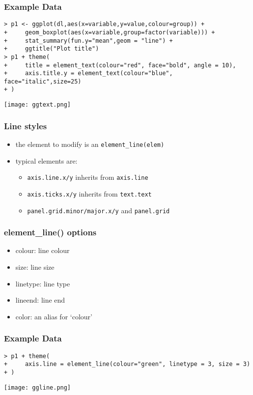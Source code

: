 \begin{frame}\frametitle{Example Data}
\scriptsize
\begin{verbatim}
> p1 <- ggplot(dl,aes(x=variable,y=value,colour=group)) +
+     geom_boxplot(aes(x=variable,group=factor(variable))) +
+     stat_summary(fun.y="mean",geom = "line") +
+     ggtitle("Plot title")
> p1 + theme(
+     title = element_text(colour="red", face="bold", angle = 10),
+     axis.title.y = element_text(colour="blue", face="italic",size=25)
+ )
\end{verbatim}
  \begin{center}
    \texttt{[image: ggtext.png]}
  \end{center}
\end{frame}



\begin{frame}\frametitle{Line styles}
  \begin{itemize}
  \item the element to modify is an \texttt{element\_line(elem)}
  \item typical elements are:
    \begin{itemize}
    \item \texttt{axis.line.x/y} inherits from \texttt{axis.line}
    \item \texttt{axis.ticks.x/y} inherits from \texttt{text.text}
    \item \texttt{panel.grid.minor/major.x/y} and \texttt{panel.grid}
    \end{itemize}
  \end{itemize}
\end{frame}

\begin{frame}\frametitle{element\_line() options}
  \begin{itemize}
  \item colour: line colour
  \item size: line size
  \item linetype: line type
  \item lineend: line end
  \item color: an alias for ‘colour’ 
  \end{itemize}
\end{frame}


\begin{frame}\frametitle{Example Data}
\scriptsize
\begin{verbatim}
> p1 + theme(
+     axis.line = element_line(colour="green", linetype = 3, size = 3)
+ )
\end{verbatim}
  \begin{center}
    \texttt{[image: ggline.png]}
  \end{center}
\end{frame}

